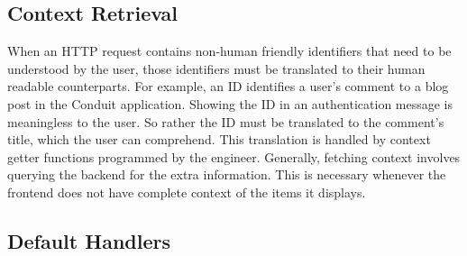 \subsection{Context Retrieval}\label{Sec:ContextRetrieval}


When an HTTP request contains non-human friendly identifiers that need to be understood by the user, those identifiers must be translated to their human readable counterparts. For example, an ID identifies a user's comment to a blog post in the Conduit application. Showing the ID in an authentication message is meaningless to the user. So rather the ID must be translated to the comment's title, which the user can comprehend. This translation is handled by context getter functions programmed by the engineer. Generally, fetching context involves querying the backend for the extra information. This is necessary whenever the frontend does not have complete context of the items it displays. 





  




\subsection{Default Handlers}\label{Sec:DefaultHandlers}

